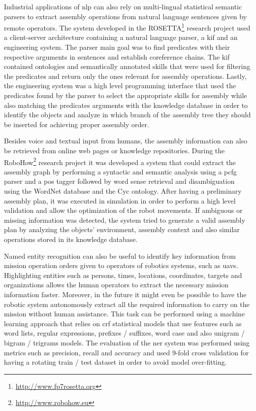 Industrial applications of \gls{nlp} \cite{Stenmark2013} can also rely on multi-lingual statistical semantic parsers to extract assembly operations from natural language sentences given by remote operators. The system developed in the ROSETTA\footnote{\url{http://www.fp7rosetta.org}} research project used a client-server architecture containing a natural language parser, a \gls{kif} and an engineering system. The parser main goal was to find predicates with their respective arguments in sentences and establish coreference chains. The \gls{kif} contained ontologies and semantically annotated skills that were used for filtering the predicates and return only the ones relevant for assembly operations. Lastly, the engineering system was a high level programming interface that used the predicates found by the parser to select the appropriate skills for assembly while also matching the predicates arguments with the knowledge database in order to identify the objects and analyze in which branch of the assembly tree they should be inserted for achieving proper assembly order.

Besides voice and textual input from humans, the assembly information can also be retrieved from online web pages or knowledge repositories. During the RoboHow\footnote{\url{http://www.robohow.eu}} research project it was developed a system \cite{Tenorth2010} that could extract the assembly graph by performing a syntactic and semantic analysis using a \gls{pcfg} parser and a \gls{pos} tagger followed by word sense retrieval and disambiguation using the WordNet database and the Cyc ontology. After having a preliminary assembly plan, it was executed in simulation in order to perform a high level validation and allow the optimization of the robot movements. If ambiguous or missing information was detected, the system tried to generate a valid assembly plan by analyzing the objects' environment, assembly context and also similar operations stored in its knowledge database.

Named entity recognition can also be useful to identify key information from mission operation orders given to operators of robotics systems, such as \glspl{uav}. Highlighting entities such as persons, times, locations, coordinates, targets and organizations allows the human operators to extract the necessary mission information faster. Moreover, in the future it might even be possible to have the robotic system autonomously extract all the required information to carry on the mission without human assistance. This task can be performed using a machine learning approach \cite{Chesworth2016} that relies on \gls{crf} statistical models that use features such as word lists, regular expressions, prefixes / suffixes, word case and also unigram / bigram / trigrams models. The evaluation of the \gls{ner} system was performed using metrics such as precision, recall and accuracy and used 9-fold cross validation for having a rotating train / test dataset in order to avoid model over-fitting.

